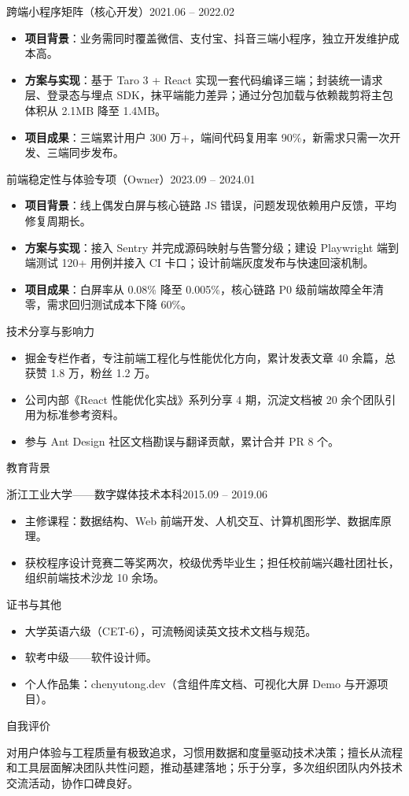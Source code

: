 \documentclass[10.5pt,fontset=windows]{ctexart}
\newcommand{\rsection}[1]{%
  \Needspace*{6\baselineskip}%
  \vspace{9pt}%
  {\color{maincolor}\heiti\zihao{4}#1}\par
  \vspace{1pt}{\color{maincolor}\rule{\textwidth}{1pt}}\par
  \vspace{3pt}}
\newcommand{\entryhead}[2]{%
  \Needspace*{3\baselineskip}%
  {\heiti #1}\hfill{\color{graytext}\small #2}\par\vspace{1pt}}
\newcommand{\subhead}[2]{%
  {\heiti #1}\hfill{\color{graytext}\small #2}\par\vspace{1pt}}
\begin{document}
\entryhead{跨端小程序矩阵（核心开发）}{2021.06 -- 2022.02}
\begin{itemize}
  \item \textbf{项目背景}：业务需同时覆盖微信、支付宝、抖音三端小程序，独立开发维护成本高。
  \item \textbf{方案与实现}：基于 Taro 3 + React 实现一套代码编译三端；封装统一请求层、登录态与埋点 SDK，抹平端能力差异；通过分包加载与依赖裁剪将主包体积从 2.1MB 降至 1.4MB。
  \item \textbf{项目成果}：三端累计用户 300 万+，端间代码复用率 90\%，新需求只需一次开发、三端同步发布。
\end{itemize}

\entryhead{前端稳定性与体验专项（Owner）}{2023.09 -- 2024.01}
\begin{itemize}
  \item \textbf{项目背景}：线上偶发白屏与核心链路 JS 错误，问题发现依赖用户反馈，平均修复周期长。
  \item \textbf{方案与实现}：接入 Sentry 并完成源码映射与告警分级；建设 Playwright 端到端测试 120+ 用例并接入 CI 卡口；设计前端灰度发布与快速回滚机制。
  \item \textbf{项目成果}：白屏率从 0.08\% 降至 0.005\%，核心链路 P0 级前端故障全年清零，需求回归测试成本下降 60\%。
\end{itemize}

\rsection{技术分享与影响力}
\begin{itemize}
  \item 掘金专栏作者，专注前端工程化与性能优化方向，累计发表文章 40 余篇，总获赞 1.8 万，粉丝 1.2 万。
  \item 公司内部《React 性能优化实战》系列分享 4 期，沉淀文档被 20 余个团队引用为标准参考资料。
  \item 参与 Ant Design 社区文档勘误与翻译贡献，累计合并 PR 8 个。
\end{itemize}

\rsection{教育背景}
\subhead{浙江工业大学\quad ——\quad 数字媒体技术\quad 本科}{2015.09 -- 2019.06}
\begin{itemize}
  \item 主修课程：数据结构、Web 前端开发、人机交互、计算机图形学、数据库原理。
  \item 获校程序设计竞赛二等奖两次，校级优秀毕业生；担任校前端兴趣社团社长，组织前端技术沙龙 10 余场。
\end{itemize}

\rsection{证书与其他}
\begin{itemize}
  \item 大学英语六级（CET-6），可流畅阅读英文技术文档与规范。
  \item 软考中级——软件设计师。
  \item 个人作品集：chenyutong.dev（含组件库文档、可视化大屏 Demo 与开源项目）。
\end{itemize}

\rsection{自我评价}
对用户体验与工程质量有极致追求，习惯用数据和度量驱动技术决策；擅长从流程和工具层面解决团队共性问题，推动基建落地；乐于分享，多次组织团队内外技术交流活动，协作口碑良好。
\end{document}
